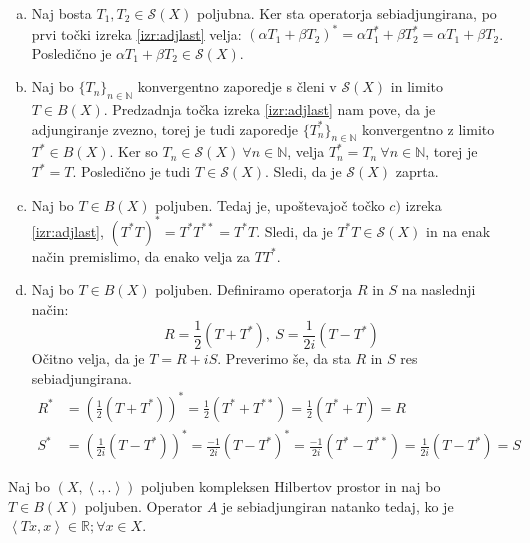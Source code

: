 \documentclass[mat2]{matdelo}
\newcommand{\R}{\mathbb{R}}
\newcommand{\N}{\mathbb{N}}
\newcommand{\Sp}[2]{\ensuremath{\left<#1, #2\right>}}
\begin{document}
			\begin{dokaz}
				\begin{enumerate}[a)]
					\item Naj bosta $T_1, T_2 \in \mathcal{S}(X)$ poljubna. Ker sta operatorja sebiadjungirana, po prvi točki izreka \ref{izr:adjlast} velja: $(\alpha T_1 + \beta T_2)^* = \alpha T_1^* + \beta T_2^* = \alpha T_1 + \beta T_2$. Posledično je $\alpha T_1 + \beta T_2 \in \mathcal{S}(X)$.
					\item Naj bo $\{T_n\}_{n\in\N}$ konvergentno zaporedje s členi v $\mathcal{S}(X)$ in limito $T\in B(X)$. Predzadnja točka izreka \ref{izr:adjlast} nam pove, da je adjungiranje zvezno, torej je tudi zaporedje $\{T_n^*\}_{n\in\N}$ konvergentno z limito $T^* \in B(X)$. Ker so $T_n \in \mathcal{S}(X)~ \forall n\in \N$, velja $T_n^* = T_n~\forall n\in \N$, torej je $T^* = T$. Posledično je tudi $T\in \mathcal{S}(X)$. Sledi, da je $\mathcal{S}(X)$ zaprta.
					\item Naj bo $T\in B(X)$ poljuben. Tedaj je, upoštevajoč točko $c)$ izreka \ref{izr:adjlast}, $(T^*T)^* = T^*T^{**} = T^*T$. Sledi, da je $T^*T\in \mathcal{S}(X)$ in na enak način premislimo, da enako velja za $TT^*$.
					\item Naj bo $T\in B(X)$ poljuben. Definiramo operatorja $R$ in $S$ na naslednji način: $$R = \frac{1}{2}(T + T^*),~ S=\frac{1}{2i}(T - T^*)$$
					Očitno velja, da je $T = R + iS$. Preverimo še, da sta $R$ in $S$ res sebiadjungirana.
					\begin{align*}
						R^* &= (\frac{1}{2}(T + T^*))^* = \frac{1}{2}(T^* + T^{**}) = \frac{1}{2}(T^* + T) = R \\
						S^* &= (\frac{1}{2i}(T - T^*))^* = \frac{-1}{2i}(T - T^*)^* = \frac{-1}{2i}(T^* - T^{**}) =\frac{1}{2i}(T - T^*) = S
					\end{align*}
				\end{enumerate}
			\end{dokaz}
			
			\begin{trditev}
				\label{trd:sebiadjop}
				Naj bo $(X, \Sp{.}{.})$ poljuben kompleksen Hilbertov prostor in naj bo $T\in B(X)$ poljuben. Operator $A$ je sebiadjungiran natanko tedaj, ko je $\Sp{Tx}{x}\in\R;\forall x\in X$.
			\end{trditev}
			
\end{document}
